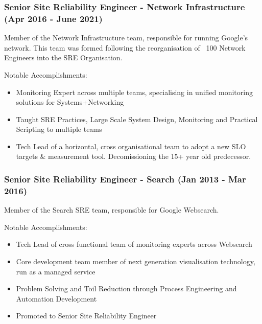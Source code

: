 \documentclass[a4paper, 10pt] {article}
\begin{document}
\subsubsection*{Senior Site Reliability Engineer - Network Infrastructure (Apr 2016 - June 2021)}

Member of the Network Infrastructure team, responsible for running Google's network. This team was formed
following the reorganisation of ~100 Network Engineers into the SRE Organisation.

\vspace{4mm}  %

Notable Accomplishments:

\begin{itemize}[itemsep=2pt,parsep=2pt]
  \item Monitoring Expert across multiple teams, specialising in unified monitoring solutions for Systems+Networking
  \item Taught SRE Practices, Large Scale System Design, Monitoring and Practical Scripting to multiple teams
  \item Tech Lead of a horizontal, cross organisational team to adopt a new SLO targets \& measurement tool. Decomissioning the 15+ year old predecessor.
\end{itemize}

\subsubsection*{Senior Site Reliability Engineer - Search (Jan 2013 - Mar 2016)}

Member of the Search SRE team, responsible for Google Websearch.

\vspace{4mm}  %

Notable Accomplishments:

\begin{itemize}[itemsep=2pt,parsep=2pt]
  \item Tech Lead of cross functional team of monitoring experts across Websearch
  \item Core development team member of next generation visualisation technology, run as a managed service
  \item Problem Solving and Toil Reduction through Process Engineering and Automation Development
  \item Promoted to Senior Site Reliability Engineer
\end{itemize}
\end{document}
